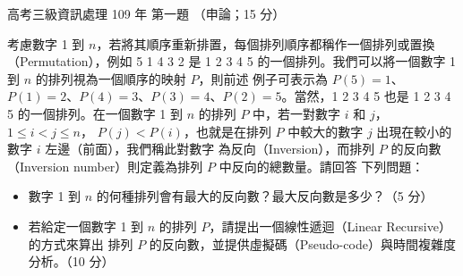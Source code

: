 \begin{pastexam}[label={px:gk3-109-ds-01}]{高考三級資訊處理 109 年 第一題}
（申論；15 分）

考慮數字 1 到 $n$，若將其順序重新排置，每個排列順序都稱作一個排列或置換（Permutation），例如
5 1 4 3 2 是 1 2 3 4 5 的一個排列。我們可以將一個數字 1 到 $n$ 的排列視為一個順序的映射 $P$，則前述
例子可表示為 $P(5) = 1$、$P(1) = 2$、$P(4) = 3$、$P(3) = 4$、$P(2) = 5$。當然，1 2 3 4 5 也是 1 2 3 4 5
的一個排列。在一個數字 1 到 $n$ 的排列 $P$ 中，若一對數字 $i$ 和 $j$，$1 \le i < j \le n$，
$P(j) < P(i)$，也就是在排列 $P$ 中較大的數字 $j$ 出現在較小的數字 $i$ 左邊（前面），我們稱此對數字
為反向（Inversion），而排列 $P$ 的反向數（Inversion number）則定義為排列 $P$ 中反向的總數量。請回答
下列問題：
\begin{itemize}[leftmargin=2em, labelsep=0.3em, itemsep=2pt]
\item[㈠] 數字 1 到 $n$ 的何種排列會有最大的反向數？最大反向數是多少？（5 分）
\item[㈡] 若給定一個數字 1 到 $n$ 的排列 $P$，請提出一個線性遞迴（Linear Recursive）的方式來算出
排列 $P$ 的反向數，並提供虛擬碼（Pseudo-code）與時間複雜度分析。（10 分）
\end{itemize}
\end{pastexam}

